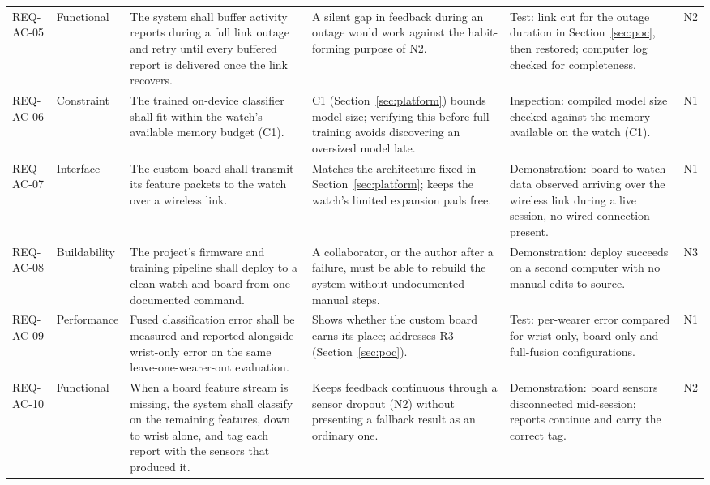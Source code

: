 \begin{table}[t]
\begin{tabular}{p{1.5cm}p{1.5cm}p{3.9cm}p{3.8cm}p{4.2cm}p{0.7cm}}
REQ-AC-05 & Functional &
The system shall buffer activity reports during a full link
outage and retry until every buffered report is delivered once
the link recovers. &
A silent gap in feedback during an outage would work against
the habit-forming purpose of N2. &
Test: link cut for the outage duration in
Section~\ref{sec:poc}, then restored; computer log checked for
completeness. &
N2 \\[0.6em]

REQ-AC-06 & Constraint &
The trained on-device classifier shall fit within the watch's
available memory budget (C1). &
C1 (Section~\ref{sec:platform}) bounds model size; verifying this
before full training avoids discovering an oversized model late. &
Inspection: compiled model size checked against the memory
available on the watch (C1). &
N1 \\[0.6em]

REQ-AC-07 & Interface &
The custom board shall transmit its feature packets to the
watch over a wireless link. &
Matches the architecture fixed in Section~\ref{sec:platform};
keeps the watch's limited expansion pads free. &
Demonstration: board-to-watch data observed arriving over the
wireless link during a live session, no wired connection
present. &
N1 \\[0.6em]

REQ-AC-08 & Buildability &
The project's firmware and training pipeline shall deploy to a
clean watch and board from one documented command. &
A collaborator, or the author after a failure, must be able to
rebuild the system without undocumented manual steps. &
Demonstration: deploy succeeds on a second computer with no
manual edits to source. &
N3 \\[0.6em]

REQ-AC-09 & Performance &
Fused classification error shall be measured and reported
alongside wrist-only error on the same leave-one-wearer-out
evaluation. &
Shows whether the custom board earns its place; addresses R3
(Section~\ref{sec:poc}). &
Test: per-wearer error compared for wrist-only, board-only and
full-fusion configurations. &
N1 \\[0.6em]

REQ-AC-10 & Functional &
When a board feature stream is missing, the system shall classify
on the remaining features, down to wrist alone, and tag each
report with the sensors that produced it. &
Keeps feedback continuous through a sensor dropout (N2) without
presenting a fallback result as an ordinary one. &
Demonstration: board sensors disconnected mid-session; reports
continue and carry the correct tag. &
N2 \\[0.6em]


\end{tabular}
\end{table}
